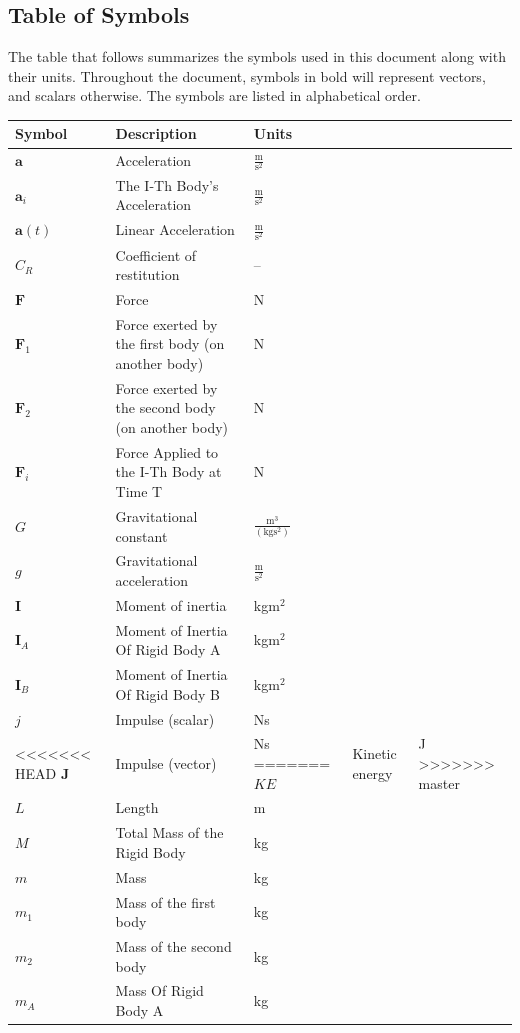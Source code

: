 \documentclass[12pt]{article}
\begin{document}
\subsection{Table of Symbols}
\label{Sec:ToS}
The table that follows summarizes the symbols used in this document along with their units. Throughout the document, symbols in bold will represent vectors, and scalars otherwise. The symbols are listed in alphabetical order.
\begin{longtabu}{l X[l] l}
\toprule
Symbol & Description & Units
\\
\midrule
\endhead
$\mathbf{a}$ & Acceleration & $\frac{\text{m}}{\text{s}^{2}}$
\\
${\mathbf{a}_{i}}$ & The I-Th Body's Acceleration & $\frac{\text{m}}{\text{s}^{2}}$
\\
$\mathbf{a}(t)$ & Linear Acceleration & $\frac{\text{m}}{\text{s}^{2}}$
\\
${C_{R}}$ & Coefficient of restitution & --
\\
$\mathbf{F}$ & Force & N
\\
${\mathbf{F}_{1}}$ & Force exerted by the first body (on another body) & N
\\
${\mathbf{F}_{2}}$ & Force exerted by the second body (on another body) & N
\\
${\mathbf{F}_{i}}$ & Force Applied to the I-Th Body at Time T & N
\\
$G$ & Gravitational constant & $\frac{\text{m}^{3}}{(\text{kg}\text{s}^{2})}$
\\
$g$ & Gravitational acceleration & $\frac{\text{m}}{\text{s}^{2}}$
\\
$\mathbf{I}$ & Moment of inertia & kg$\text{m}^{2}$
\\
${\mathbf{I}_{A}}$ & Moment of Inertia Of Rigid Body A & kg$\text{m}^{2}$
\\
${\mathbf{I}_{B}}$ & Moment of Inertia Of Rigid Body B & kg$\text{m}^{2}$
\\
$j$ & Impulse (scalar) & Ns
\\
<<<<<<< HEAD
$\mathbf{J}$ & Impulse (vector) & Ns
=======
$KE$ & Kinetic energy & J
>>>>>>> master
\\
$L$ & Length & m
\\
$M$ & Total Mass of the Rigid Body & kg
\\
$m$ & Mass & kg
\\
${m_{1}}$ & Mass of the first body & kg
\\
${m_{2}}$ & Mass of the second body & kg
\\
${m_{A}}$ & Mass Of Rigid Body A & kg

\end{longtabu}
\end{document}
